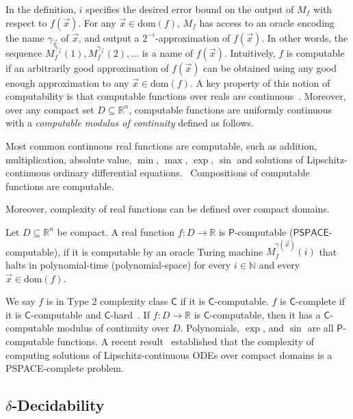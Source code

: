 \documentclass[envcountsect]{llncs}
\newcommand{\dom}{\mathrm{dom}}
\begin{document}
In the definition, $i$ specifies the desired error bound on the output of $M_f$ 
with respect to $f(\vec x)$. For any $\vec x\in \dom(f)$, $M_f$ has access to an
oracle encoding the name $\gamma_{\vec x}$ of $\vec x$, and output a
$2^{-i}$-approximation of $f(\vec x)$. In other words, the sequence
$M_f^{\gamma_{\vec x}}(1), M_f^{\gamma_{\vec x}}(2), ...$ is a name of $f(\vec
x)$. Intuitively, $f$ is computable if an arbitrarily good approximation of
$f(\vec x)$ can be obtained using any good enough approximation to any $\vec
x\in\dom(f)$. A key property of this notion of computability is that computable
functions over reals are continuous~\cite{CAbook}. Moreover, over any compact
set $D\subseteq \mathbb{R}^n$, computable functions are uniformly continuous
with a {\em computable modulus of continuity} defined as follows. 

Most common continuous real functions are computable, such as addition,
multiplication,  absolute value, $\min$, $\max$, $\exp$, $\sin$ and solutions of
Lipschitz-continuous ordinary differential equations.~\cite{CAbook} Compositions
of computable functions are computable.


Moreover, complexity of real functions can be defined over compact domains. 

\begin{definition}[\cite{Ko92}] Let $D\subseteq \mathbb{R}^n$ be compact. A 
real function $f:D\rightarrow\mathbb{R}$ is $\mathsf{P}$-computable
($\mathsf{PSPACE}$-computable), if it is computable by an oracle Turing machine
$M_{f}^{\gamma(\vec x)}(i)$ that halts in polynomial-time (polynomial-space) for
every $i\in \mathbb{N}$ and every $\vec x\in \dom(f)$. 
\end{definition}



We say $f$ is in Type 2 complexity class $\mathsf{C}$ if it is
$\mathsf{C}$-computable.  $f$ is $\mathsf{C}$-complete if it is
$\mathsf{C}$-computable and $\mathsf{C}$-hard~\cite{Kobook}. If $f:D\rightarrow
\mathbb{R}$ is $\mathsf{C}$-computable, then it has a $\mathsf{C}$-computable
modulus of continuity over $D$. Polynomials, $\exp$, and $\sin$ are all
$\mathsf{P}$-computable functions. A recent result~\cite{Kawamura09} established
that the complexity of computing solutions of Lipschitz-continuous ODEs over
compact domains is a {\sf PSPACE}-complete problem. 

\subsection{$\delta$-Decidability}
\end{document}
